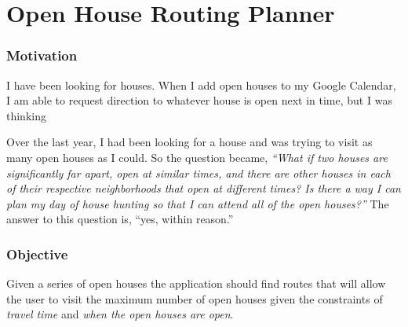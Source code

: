 \documentclass[letterpaper,11pt]{report}
\theoremstyle{definition}
\theoremstyle{definition}
\begin{document}
%
%

%
%

%
%

%
%

%
%

%
%

%
%

%
%


\chapter{Open House Routing Planner}
\subsection{Motivation}
I have been looking for houses. When I add open houses to my Google Calendar, I am able to request direction to whatever house is open next in time, but I was thinking

Over the last year, I had been looking for a house and was trying to visit as many open houses as I could. So the question became, \emph{``What if two houses are significantly far apart, open at similar times, and there are other houses in each of their respective neighborhoods that open at different times? Is there a way I can plan my day of house hunting so that I can attend all of the open houses?''} The answer to this question is, ``yes, within reason.''

\subsection{Objective}
Given a series of open houses the application should find routes that will allow the user to visit the maximum number of open houses given the constraints of \emph{travel time} and \emph{when the open houses are open}.
\end{document}
